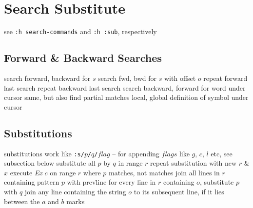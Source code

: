 \section{Search \or Substitute}	{see {\tt :h search-commands} and {\tt :h :sub}, respectively}
\subsection{Forward \& Backward Searches}	{}
	{search forward, backward for $s$}
	{search fwd, bwd for $s$ with offset $o$}
	{repeat forward last search}
	{repeat backward last search}
\cmdS{\# * }	{search backward, forward for word under cursor}
	{same, but also find partial matches}
	{local, global definition of symbol under cursor}

\subsection{Substitutions}	{substitutions work like {\tt:s/$p$/$q$/$flag$} -- for appending $flags$ like $g$, $c$, $l$ etc, see subsection below}
	{substitute all $p$ by $q$ in range $r$}
	{repeat substitution with new $r$ \& $x$}
	{execute {\it Ex\/} $c$ on range $r$ where $p$ mat\-ches, not matches}
	{join all lines in $r$ containing pattern $p$ with prev\. line}
	{for every line in $r$ containing $o$, substitute $p$ with $q$}
	{join any line containing the string $o$ to its subsequent line, if it lies between the $a$ and $b$ marks}

